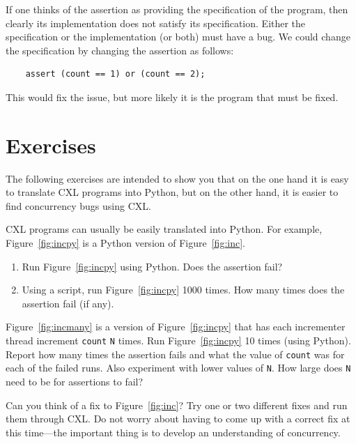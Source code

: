 \documentclass{report}
\newenvironment{code}{
\tcolorbox
}{
\endtcolorbox
}
\begin{document}
If one thinks of the assertion as providing the specification of the
program, then clearly its implementation does not satisfy its specification.
Either the specification or the implementation (or both) must have a bug.
We could change the specification by changing the assertion as follows:

\begin{code}
\begin{verbatim}
    assert (count == 1) or (count == 2);
\end{verbatim}
\end{code}

This would fix the issue, but more likely it is the program that must
be fixed.

\section*{Exercises}

The following exercises are intended to show you that on the one hand it
is easy to translate CXL programs into Python, but on the other hand,
it is easier to find concurrency bugs using CXL.

\begin{problems}
\item CXL programs can usually be easily translated into Python.  For example,
Figure~\ref{fig:incpy} is a Python version of Figure~\ref{fig:inc}.
\begin{enumerate}
\item Run Figure~\ref{fig:incpy} using Python.  Does the assertion fail?
\item Using a script, run Figure~\ref{fig:incpy} 1000 times.  How many times does the assertion
fail (if any).
\end{enumerate}
\item Figure~\ref{fig:incmany} is a version of Figure~\ref{fig:incpy} that has each
incrementer thread increment \texttt{count} \texttt{N} times.  Run Figure~\ref{fig:incpy}
10 times (using Python).
Report how many times the assertion fails and what the value of \texttt{count}
was for each of the failed runs.
Also experiment with lower values of \texttt{N}.
How large does \texttt{N} need to be for assertions to fail?
\item Can you think of a fix to Figure~\ref{fig:inc}?  Try one or two different fixes
and run them through CXL.  Do not worry about having to come up with a correct fix at this
time---the important thing is to develop an understanding of concurrency.
\end{problems}
\end{document}
